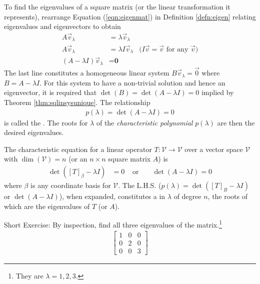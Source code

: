 To find the eigenvalues of a square matrix (or the linear transformation it represents), rearrange Equation (\ref{eqn:eigenmat}) in Definition \ref{defn:eigen} relating eigenvalues and eigenvectors to obtain
\begin{align}
A\vec{v}_\lambda &= \lambda\vec{v}_\lambda \nonumber \\
A\vec{v}_\lambda &= \lambda I\vec{v}_\lambda  &\text{($I\vec{v} = \vec{v}$ for any $\vec{v}$)} \nonumber  \\
(A-\lambda I)\vec{v}_\lambda &= \textbf{0} \label{eqn:eigenminus}
\end{align}
The last line constitutes a homogeneous linear system $B\vec{v}_\lambda = \vec{0}$ where $B = A - \lambda I$. For this system to have a non-trivial solution and hence an eigenvector, it is required that $\det(B) = \det(A - \lambda I) = 0$ implied by Theorem \ref{thm:sqlinsysunique}. The relationship 
\begin{align}
p(\lambda) = \det(A - \lambda I) = 0    
\end{align}
is called the . The roots for $\lambda$ of the \textit{characteristic polynomial} $p(\lambda)$ are then the desired eigenvalues.
\begin{defn}
\label{defn:charactereqn}
The characteristic equation for a linear operator $T: \mathcal{V} \to \mathcal{V}$ over a vector space $\mathcal{V}$ with $\dim(\mathcal{V}) = n$ (or an $n \times n$ square matrix $A$) is
\begin{align*}
\det([T]_\beta - \lambda I) &= 0 & \text{ or } & & \det(A-\lambda I) = 0
\end{align*}
where $\mathcal{\beta}$ is any coordinate basis for $\mathcal{V}$. The L.H.S. ($p(\lambda) = \det([T]_B - \lambda I)$ or $\det(A-\lambda I)$), when expanded, constitutes a  in $\lambda$ of degree $n$, the roots of which are the eigenvalues of $T$ (or $A$).
\end{defn}
Short Exercise: By inspection, find all three eigenvalues of the matrix.\footnote{They are $\lambda = 1,2,3$.}
\begin{align*}
\begin{bmatrix}
1 & 0 & 0 \\
0 & 2 & 0 \\
0 & 0 & 3
\end{bmatrix}
\end{align*}
